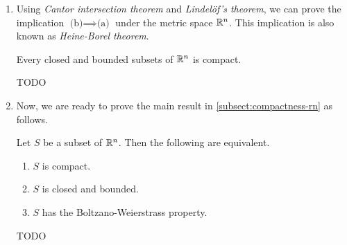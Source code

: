 \begin{enumerate}
\item Using \emph{Cantor intersection theorem} and \emph{Lindel\"of's theorem},
we can prove the implication \(\text{(b)}\implies \text{(a)}\) under the metric
space \(\mathbb{R}^n\). This implication is also known as \emph{Heine-Borel theorem}.

\begin{theorem}
\label{thm:heine-borel}
Every closed and bounded subsets of \(\mathbb{R}^n\) is compact.
\end{theorem}
\begin{pf}
TODO
\end{pf}

\item Now, we are ready to prove the main result in
\cref{subsect:compactness-rn} as follows.

\begin{theorem}
\label{thm:cpt-equiv-criteria-rn}
Let \(S\) be a subset of \(\mathbb{R}^n\). Then the following are equivalent.
\begin{enumerate}
\item \(S\) is compact.
\item \(S\) is closed and bounded.
\item \(S\) has the Boltzano-Weierstrass property.
\end{enumerate}
\end{theorem}
\begin{pf}
TODO
\end{pf}
\end{enumerate}
